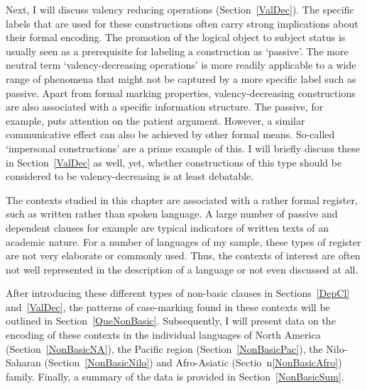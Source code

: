 Next, I will discuss  valency reducing operations (Section~\ref{ValDec}). 
The specific labels that are used for these constructions often carry strong implications about their formal encoding. 
The promotion of the logical object to subject status is usually seen as a prerequisite for labeling a construction as `passive'. 
The more neutral term `valency-decreasing operations' is more readily applicable to a wide range of phenomena that might not be captured by a more specific label such as passive.
Apart from formal marking properties, valency-decreasing constructions are also associated with a specific information structure. 
The passive, for example, puts attention on the patient argument. 
However, a similar communicative effect can also be achieved by other formal means. 
So-called `impersonal constructions' are a prime example of this. 
I will briefly discuss these in Section~\ref{ValDec} as well, yet, whether constructions of this type should be considered to be valency-decreasing is at least debatable. 


The contexts studied in this chapter are associated with a rather formal register, such as written rather than spoken language.
A large number of passive and dependent clauses for example are typical indicators of written texts of an academic nature. 
For a number of languages of my sample, these types of register are not very elaborate or commonly used. 
Thus, the contexts of interest are often not  well represented in the description of a language or not even discussed at all. 

After introducing these different types of non-basic clauses in Sections~\ref{DepCl} and~\ref{ValDec}, 
the patterns of case-marking found in these contexts will be outlined in Section~\ref{QueNonBasic}. 
Subsequently, I will present data on the encoding of these contexts in the individual languages of North America (Section~\ref{NonBasicNA}), the Pacific region (Section~\ref{NonBasicPac}), the Nilo-Saharan (Section~\ref{NonBasicNilo}) and Afro-Asiatic (Sectio~n\ref{NonBasicAfro}) family. 
Finally, a summary of the data is provided in Section~\ref{NonBasicSum}.     

